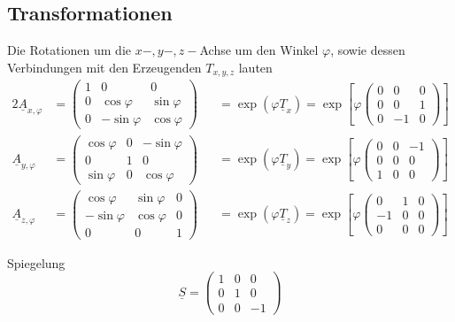 \documentclass{article}
\newcommand{\lr}[1]{\left(#1\right)}
\newcommand{\lreck}[1]{\left[#1\right]}
\begin{document}
\subsection{Transformationen}
Die Rotationen um die $x-,y-,z-$Achse um den Winkel $\varphi$, sowie dessen Verbindungen mit den Erzeugenden $T_{x,y,z}$ lauten
	\begin{alignat}{2}
		\underline{A}_{x,\varphi} &=
		\begin{pmatrix}
			1 & 0 & 0 \\
			0 & \cos\varphi & \sin\varphi \\
			0 & -\sin\varphi & \cos\varphi
		\end{pmatrix}
		&& = \exp\lr{\varphi\underline{T}_x} = \exp\lreck{\varphi 
		\begin{pmatrix}
			0 & 0 & 0 \\
			0 & 0 & 1 \\
			0 & -1 & 0
		\end{pmatrix}} \\
		\underline{A}_{y,\varphi} &=
		\begin{pmatrix}
			\cos\varphi  & 0 & -\sin\varphi \\
			0 & 1 & 0 \\
			\sin\varphi & 0 & \cos\varphi
		\end{pmatrix}
		&& = \exp\lr{\varphi\underline{T}_y} = \exp\lreck{\varphi 
		\begin{pmatrix}
			0 & 0 & -1 \\
			0 & 0 & 0 \\
			1 & 0 & 0
		\end{pmatrix}} \\
		\underline{A}_{z,\varphi} &=
		\begin{pmatrix}
			\cos\varphi & \sin\varphi & 0 \\
			-\sin\varphi & \cos\varphi & 0 \\
			0 & 0 & 1
		\end{pmatrix}
		&& = \exp\lr{\varphi\underline{T}_z} = \exp\lreck{\varphi 
		\begin{pmatrix}
			0 & 1 & 0 \\
			-1 & 0 & 0 \\
			0 & 0 & 0
		\end{pmatrix}}
	\end{alignat}

Spiegelung
	\begin{equation}
		\underline{S} =
		\begin{pmatrix}
			1 & 0 & 0 \\
			0 & 1 & 0 \\
			0 & 0 & -1
		\end{pmatrix}
	\end{equation}
\end{document}
